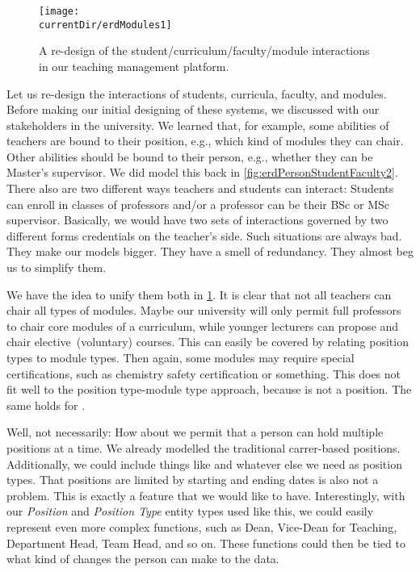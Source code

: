 \begin{figure}%
\centering%
\texttt{[image: \\currentDir/erdModules1]}%
\caption{A re-design of the student/curriculum/faculty/module interactions in our teaching management platform.}%
\label{fig:erdModules1}%
\end{figure}%
%
Let us re-design the interactions of students, curricula, faculty, and modules.
Before making our initial designing of these systems, we discussed with our stakeholders in the university.
We learned that, for example, some abilities of teachers are bound to their position, e.g., which kind of modules they can chair.
Other abilities should be bound to their person, e.g., whether they can be Master's supervisor.
We did model this back in \cref{fig:erdPersonStudentFaculty2}.
There also are two different ways teachers and students can interact:
Students can enroll in classes of professors and/or a professor can be their BSc or MSc supervisor.
Basically, we would have two sets of interactions governed by two different forms credentials on the teacher's side.
Such situations are always bad.
They make our models bigger.
They have a smell of redundancy.
They almost beg us to simplify them.

We have the idea to unify them both in \cref{fig:erdModules1}.
It is clear that not all teachers can chair all types of modules.
Maybe our university will only permit full professors to chair core modules of a curriculum, while younger lecturers can propose and chair elective~(voluntary) courses.
This can easily be covered by relating position types to module types.
Then again, some modules may require special certifications, such as chemistry safety certification or something.
This does not fit well to the position type-module type approach, because  is not a position.
The same holds for .

Well, not necessarily:
How about we permit that a person can hold multiple positions at a time.
We already modelled the traditional carrer-based positions.
Additionally, we could include things like   and whatever else we need as position types.
That positions are limited by starting and ending dates is also not a problem.
This is exactly a feature that we would like to have.
Interestingly, with our \emph{Position} and \emph{Position Type} entity types used like this, we could easily represent even more complex functions, such as Dean, Vice-Dean for Teaching, Department Head, Team Head, and so on.
These functions could then be tied to what kind of changes the person can make to the data.

